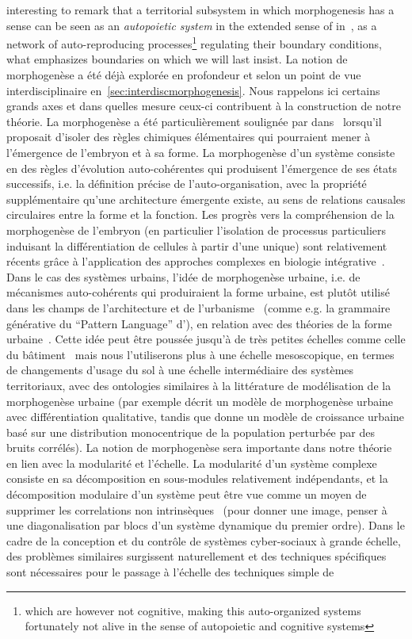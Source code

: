 {interesting to remark that a territorial subsystem in which morphogenesis has a sense can be seen as an \emph{autopoietic system} in the extended sense of  in~\cite{bourgine2004autopoiesis}, as a network of auto-reproducing processes\footnote{which are however not cognitive, making this auto-organized systems fortunately not alive in the sense of autopoietic and cognitive systems} regulating their boundary conditions, what emphasizes boundaries on which we will last insist.
}{
La notion de morphogenèse a été déjà explorée en profondeur et selon un point de vue interdisciplinaire en~\ref{sec:interdiscmorphogenesis}. Nous rappelons ici certains grands axes et dans quelles mesure ceux-ci contribuent à la construction de notre théorie. La morphogenèse a été particulièrement soulignée par  dans~\cite{turing1952chemical} lorsqu'il proposait d'isoler des règles chimiques élémentaires qui pourraient mener à l'émergence de l'embryon et à sa forme. La morphogenèse d'un système consiste en des règles d'évolution auto-cohérentes qui produisent l'émergence de ses états successifs, i.e. la définition précise de l'auto-organisation, avec la propriété supplémentaire qu'une architecture émergente existe, au sens de relations causales circulaires entre la forme et la fonction. Les progrès vers la compréhension de la morphogenèse de l'embryon (en particulier l'isolation de processus particuliers induisant la différentiation de cellules à partir d'une unique) sont relativement récents grâce à l'application des approches complexes en biologie intégrative~\cite{delile2016chapitre}. Dans le cas des systèmes urbains, l'idée de morphogenèse urbaine, i.e. de mécanismes auto-cohérents qui produiraient la forme urbaine, est plutôt utilisé dans les champs de l'architecture et de l'urbanisme~\cite{hachi2013master} (comme e.g. la grammaire générative du ``Pattern Language'' d'), en relation avec des théories de la forme urbaine~\cite{moudon1997urban}. Cette idée peut être poussée jusqu'à de très petites échelles comme celle du bâtiment~\cite{whitehand1999urban} mais nous l'utiliserons plus à une échelle mesoscopique, en termes de changements d'usage du sol à une échelle intermédiaire des systèmes territoriaux, avec des ontologies similaires à la littérature de modélisation de la morphogenèse urbaine (par exemple \cite{bonin2012modele} décrit un modèle de morphogenèse urbaine avec différentiation qualitative, tandis que \cite{makse1998modeling} donne un modèle de croissance urbaine basé sur une distribution monocentrique de la population perturbée par des bruits corrélés). La notion de morphogenèse sera importante dans notre théorie en lien avec la modularité et l'échelle. La modularité d'un système complexe consiste en sa décomposition en sous-modules relativement indépendants, et la décomposition modulaire d'un système peut être vue comme un moyen de supprimer les correlations non intrinsèques~\cite{2015arXiv150904386K} (pour donner une image, penser à une diagonalisation par blocs d'un système dynamique du premier ordre). Dans le cadre de la conception et du contrôle de systèmes cyber-sociaux à grande échelle, des problèmes similaires surgissent naturellement et des techniques spécifiques sont nécessaires pour le passage à l'échelle des techniques simple de }
